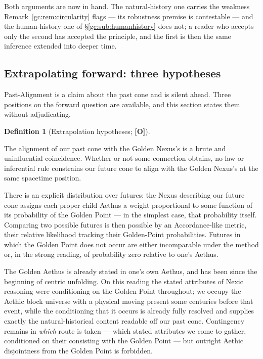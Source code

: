 \documentclass[11pt]{article}
\numberwithin{equation}{section}
\theoremstyle{plain}
\theoremstyle{definition}
\newtheorem{definition}[theorem]{Definition}
\theoremstyle{remark}
\begin{document}
Both arguments are now in hand. The natural-history one carries the
weakness Remark~\ref{gc:rem:circularity} flags --- its robustness
premise is contestable --- and the human-history one of
\S\ref{gc:sub:humanhistory} does not; a reader who accepts only the
second has accepted the principle, and the first is then the same
inference extended into deeper time.

\subsection{Extrapolating forward: three hypotheses}
\label{gc:sub:extrapolation}

Past-Alignment is a claim about the past cone and is silent ahead. Three
positions on the forward question are available, and this section states
them without adjudicating.

\begin{definition}[Extrapolation hypotheses; \textbf{[O]}]
\label{gc:def:extrapolation}
\begin{description}\itemsep3pt
\item[Void.] The alignment of our past cone with the Golden Nexus's is
a brute and uninfluential coincidence. Whether or not some connection
obtains, no law or inferential rule constrains our future cone to align
with the Golden Nexus's at the same spacetime position.

\item[Weak.] There is an explicit distribution over futures: the Nexus
describing our future cone assigns each proper child Aethus a weight
proportional to some function of its probability of the Golden Point ---
in the simplest case, that probability itself. Comparing two possible
futures is then possible by an Accordance-like metric, their relative
likelihood tracking their Golden-Point probabilities. Futures in which
the Golden Point does not occur are either incomparable under the
method or, in the strong reading, of probability zero relative to one's
Aethus.

\item[Strong.] The Golden Aethus is already stated in one's own Aethus,
and has been since the beginning of centric unfolding. On this reading
the stated attributes of Nexic reasoning were conditioning on the Golden
Point throughout; we occupy the Aethic block universe with a physical
moving present some centuries before that event, while the conditioning
that it occurs is already fully resolved and supplies exactly the
natural-historical content readable off our past cone. Contingency
remains in \emph{which} route is taken --- which stated attributes we
come to gather, conditioned on their consisting with the Golden Point
--- but outright Aethic disjointness from the Golden Point is
forbidden.
\end{description}
\end{definition}
\end{document}

